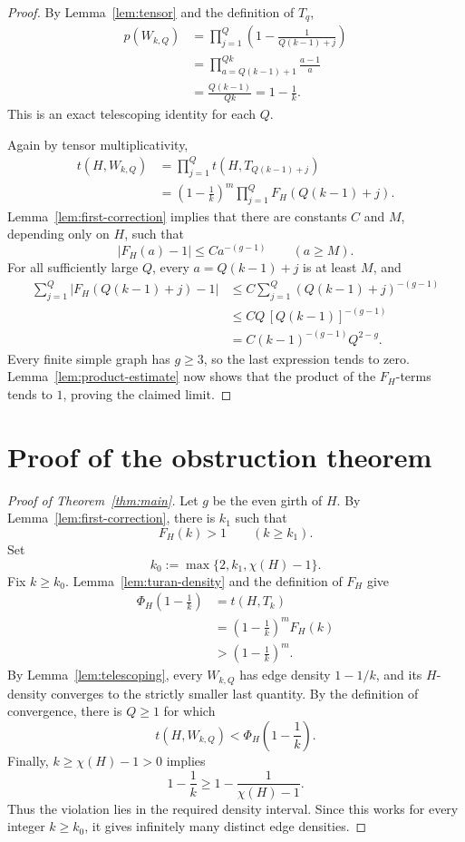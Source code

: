 \documentclass[11pt]{article}
\newcommand{\PhiH}{\Phi_H}
\begin{document}
\begin{proof}
By Lemma~\ref{lem:tensor} and the definition of \(T_q\),
\[
\begin{aligned}
    p(W_{k,Q})
    &=
    \prod_{j=1}^{Q}
       \left(1-\frac{1}{Q(k-1)+j}\right)\\
    &=
    \prod_{a=Q(k-1)+1}^{Qk}\frac{a-1}{a}\\
    &=
    \frac{Q(k-1)}{Qk}
    =1-\frac1k.
\end{aligned}
\]
This is an exact telescoping identity for each \(Q\).

Again by tensor multiplicativity,
\[
\begin{aligned}
    t(H,W_{k,Q})
    &=
    \prod_{j=1}^{Q}t\!\left(H,T_{Q(k-1)+j}\right)\\
    &=
    \left(1-\frac1k\right)^m
      \prod_{j=1}^{Q}F_H(Q(k-1)+j).
\end{aligned}
\]
Lemma~\ref{lem:first-correction} implies that there are constants
\(C\) and \(M\), depending only on \(H\), such that
\[
    |F_H(a)-1|\le Ca^{-(g-1)}
    \qquad(a\ge M).
\]
For all sufficiently large \(Q\), every
\(a=Q(k-1)+j\) is at least \(M\), and
\[
\begin{aligned}
    \sum_{j=1}^{Q}|F_H(Q(k-1)+j)-1|
    &\le
    C\sum_{j=1}^{Q}(Q(k-1)+j)^{-(g-1)}\\
    &\le
    C Q\,[Q(k-1)]^{-(g-1)}\\
    &=
    C(k-1)^{-(g-1)}Q^{2-g}.
\end{aligned}
\]
Every finite simple graph has \(g\ge3\), so the last expression tends
to zero.  Lemma~\ref{lem:product-estimate} now shows that the product of
the \(F_H\)-terms tends to \(1\), proving the claimed limit.
\end{proof}

\section{Proof of the obstruction theorem}

\begin{proof}[Proof of Theorem~\ref{thm:main}]
Let \(g\) be the even girth of \(H\).  By
Lemma~\ref{lem:first-correction}, there is \(k_1\) such that
\[
    F_H(k)>1
    \qquad(k\ge k_1).
\]
Set
\[
    k_0:=\max\{2,k_1,\chi(H)-1\}.
\]
Fix \(k\ge k_0\).  Lemma~\ref{lem:turan-density} and the definition of
\(F_H\) give
\[
\begin{aligned}
    \PhiH\!\left(1-\frac1k\right)
    &=t(H,T_k)\\
    &=\left(1-\frac1k\right)^mF_H(k)\\
    &>\left(1-\frac1k\right)^m.
\end{aligned}
\]
By Lemma~\ref{lem:telescoping}, every \(W_{k,Q}\) has edge density
\(1-1/k\), and its \(H\)-density converges to the strictly smaller last
quantity.  By the definition of convergence, there is \(Q\ge1\) for
which
\[
    t(H,W_{k,Q})
    <
    \PhiH\!\left(1-\frac1k\right).
\]
Finally, \(k\ge\chi(H)-1>0\) implies
\[
    1-\frac1k
    \ge
    1-\frac{1}{\chi(H)-1}.
\]
Thus the violation lies in the required density interval.  Since this
works for every integer \(k\ge k_0\), it gives infinitely many distinct
edge densities.
\end{proof}
\end{document}
